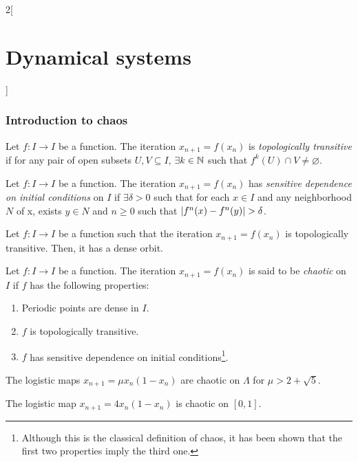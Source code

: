 \documentclass[../../../main_math.tex]{subfiles}
\begin{document}
\begin{multicols}{2}[\section{Dynamical systems}]
  \subsubsection{Introduction to chaos}
  \begin{definition}
    Let $f : I\rightarrow I$ be a function. The iteration $x_{n+1}=f(x_n)$ is \emph{topologically transitive} if for any pair of open subsets $U,V\subseteq I$, $\exists k\in\mathbb{N}$ such that $f^k(U)\cap V\ne\varnothing$.
  \end{definition}
  \begin{definition}
    Let $f : I\rightarrow I$ be a function. The iteration $x_{n+1}=f(x_n)$ has \emph{sensitive dependence on initial conditions} on $I$ if $\exists\delta >0$ such that for each $x\in I$ and any neighborhood $N$ of x, exists $y \in N$ and $n \geq  0$ such that $\abs{f^n(x)-f^n(y)} > \delta$.
  \end{definition}
  \begin{lemma}
    Let $f : I\rightarrow I$ be a function such that the iteration $x_{n+1}=f(x_n)$ is topologically transitive. Then, it has a dense orbit.
  \end{lemma}
  \begin{definition}[Chaos]
    Let $f : I\rightarrow I$ be a function. The iteration $x_{n+1}=f(x_n)$ is said to be \emph{chaotic} on $I$ if $f$ has the following properties:
    \begin{enumerate}
      \item Periodic points are dense in $I$.
      \item $f$ is topologically transitive.
      \item $f$ has sensitive dependence on initial conditions\footnote{Although this is the classical definition of chaos, it has been shown that the first two properties imply the third one.}.
    \end{enumerate}
  \end{definition}
  \begin{theorem}
    The logistic maps $x_{n+1}=\mu x_n(1-x_n)$ are chaotic on $\Lambda$ for $\mu>2+\sqrt{5}$.
  \end{theorem}
  \begin{theorem}
    The logistic map $x_{n+1}=4x_n(1-x_n)$ is chaotic on $[0,1]$.
  \end{theorem}
\end{multicols}
\end{document}
